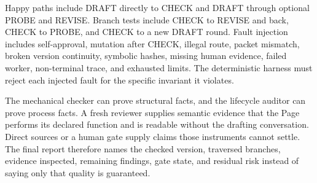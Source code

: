 Happy paths include DRAFT directly to CHECK and DRAFT through optional PROBE and REVISE. Branch tests include CHECK to REVISE and back, CHECK to PROBE, and CHECK to a new DRAFT round. Fault injection includes self-approval, mutation after CHECK, illegal route, packet mismatch, broken version continuity, symbolic hashes, missing human evidence, failed worker, non-terminal trace, and exhausted limits. The deterministic harness must reject each injected fault for the specific invariant it violates.

The mechanical checker can prove structural facts, and the lifecycle auditor can prove process facts. A fresh reviewer supplies semantic evidence that the Page performs its declared function and is readable without the drafting conversation. Direct sources or a human gate supply claims those instruments cannot settle. The final report therefore names the checked version, traversed branches, evidence inspected, remaining findings, gate state, and residual risk instead of saying only that quality is guaranteed.

